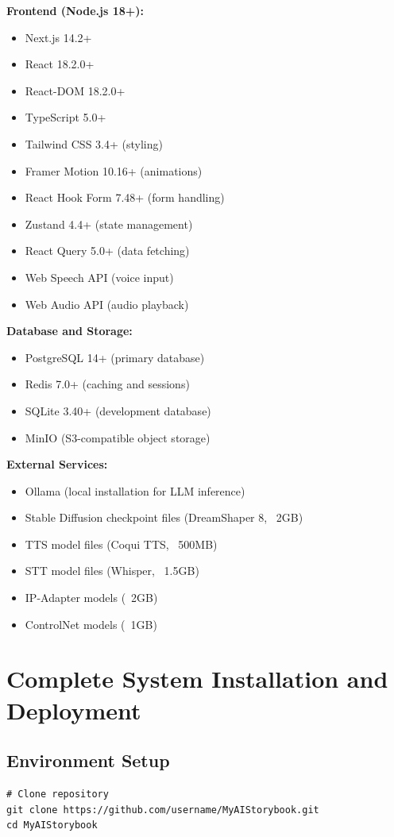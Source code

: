 {\textbf{Frontend (Node.js 18+):}
\begin{itemize}
    \item Next.js 14.2+
    \item React 18.2.0+
    \item React-DOM 18.2.0+
    \item TypeScript 5.0+
    \item Tailwind CSS 3.4+ (styling)
    \item Framer Motion 10.16+ (animations)
    \item React Hook Form 7.48+ (form handling)
    \item Zustand 4.4+ (state management)
    \item React Query 5.0+ (data fetching)
    \item Web Speech API (voice input)
    \item Web Audio API (audio playback)
\end{itemize}

\textbf{Database and Storage:}
\begin{itemize}
    \item PostgreSQL 14+ (primary database)
    \item Redis 7.0+ (caching and sessions)
    \item SQLite 3.40+ (development database)
    \item MinIO (S3-compatible object storage)
\end{itemize}

\textbf{External Services:}
\begin{itemize}
    \item Ollama (local installation for LLM inference)
    \item Stable Diffusion checkpoint files (DreamShaper 8, ~2GB)
    \item TTS model files (Coqui TTS, ~500MB)
    \item STT model files (Whisper, ~1.5GB)
    \item IP-Adapter models (~2GB)
    \item ControlNet models (~1GB)
\end{itemize}

\section{Complete System Installation and Deployment}

\subsection{Environment Setup}
\begin{verbatim}
# Clone repository
git clone https://github.com/username/MyAIStorybook.git
cd MyAIStorybook


\end{verbatim}}
